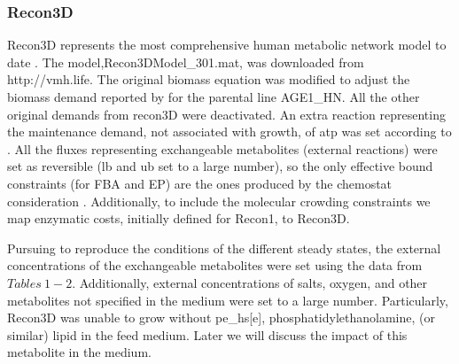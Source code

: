 	\subsubsection{Recon3D}
	
	Recon3D represents the most comprehensive human metabolic network model to date \cite{Brunk2018}. The model,Recon3DModel\_301.mat, was downloaded from http://vmh.life. The original biomass equation was modified to adjust the biomass demand reported by \cite{Niklas2013} for the parental line AGE1\_HN. All the other original demands from recon3D were deactivated. An extra reaction representing the maintenance demand, not associated with growth, of atp was set according to \cite{Fernandez-de-Cossio-Diaz2018b}. All the fluxes representing exchangeable metabolites (external reactions) were set as reversible (lb and ub set to a large number), so the only effective bound constraints (for FBA and EP) are the ones produced by the chemostat consideration \cite{Fernandez-de-Cossio-Diaz2018b}. Additionally, to include the molecular crowding constraints we map \cite{Shlomi2011} enzymatic costs, initially defined for Recon1, to Recon3D.
	
	Pursuing to reproduce the conditions of the different steady states, the external concentrations of the exchangeable metabolites were set using the data from $Tables\ 1-2$. Additionally, external concentrations of salts, oxygen, and other metabolites not specified in the medium were set to a large number. Particularly, Recon3D was unable to grow without pe\_hs[e], phosphatidylethanolamine, (or similar) lipid in the feed medium. Later we will discuss the impact of this metabolite in the medium.  